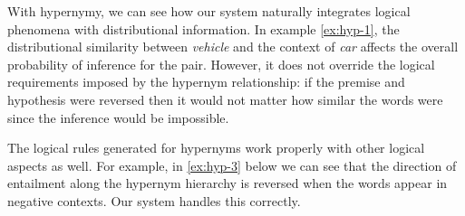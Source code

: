 
With hypernymy, we can see how our system naturally integrates logical phenomena
with distributional information.  In example \eqref{ex:hyp-1}, the
distributional similarity between {\it vehicle} and the context of {\it car}
affects the overall probability of inference for the pair.  However, it does not
override the logical requirements imposed by the hypernym relationship: if the
premise and hypothesis were reversed then it would not matter how similar the
words were since the inference would be impossible.

The logical rules generated for hypernyms work properly with other logical
aspects as well.  For example, in \eqref{ex:hyp-3} below we can see that the
direction of entailment along the hypernym hierarchy is reversed when the words
appear in negative contexts.  Our system handles this correctly.

% 
% 
% 
